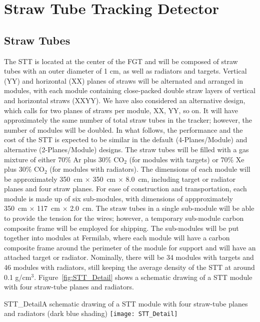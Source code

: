 \section{Straw Tube Tracking Detector}
\label{sec:nd-nnd-straw}

\subsection{Straw Tubes}

The STT is located at the center of the FGT and 
will be composed of straw tubes with an outer diameter of 1 cm, as well as 
radiators and targets. 
Vertical (YY) and horizontal (XX) planes of straws will be alternated and 
arranged in modules, with each module containing close-packed double straw layers 
of vertical and horizontal straws (XXYY). 
We have also considered an alternative design, which calls for two planes of straws
per module, XX, YY, so on. It will have approximately the same number of
total straw tubes in the tracker; however, the number of modules will be doubled.
In what follows, the performance and the cost of the STT is expected to be similar 
in the default (4-Planes/Module) and alternative (2-Planes/Module) designs.
The straw tubes will be filled with a
gas mixture of either 70\% Ar plus 30\% CO$_2$ (for modules with targets) or
70\% Xe plus 30\% CO$_2$ (for modules with radiators).
The dimensions of each module will
be approximately 350~cm $\times$ 350~cm $\times$ 8.0~cm, including 
target or radiator planes and four straw planes. For ease of construction and
transportation, each module is made up of six sub-modules, with dimensions of
appproximately 350~cm $\times$ 117~cm $\times$ 2.0~cm. 
The straw tubes in a single sub-module will be able to provide the tension 
for the wires; however, a temporary sub-module carbon composite frame will 
be employed for shipping. The sub-modules will be put together into modules 
at Fermilab, where each module will have a carbon composite frame around 
the perimeter of the module for support and will have an attached target or 
radiator. Nominally, there will be 34 modules with targets and 46 modules 
with radiators, still keeping the 
average density of the STT at around 0.1 g/cm$^3$. Figure~\ref{fig:STT_Detail}
shows a schematic drawing of a STT module with four straw-tube planes and
radiators.


\begin{cdrfigure}{STT_Detail}{A schematic drawing of a STT module with four straw-tube planes and
radiators (dark blue shading)}
\texttt{[image: STT\_Detail]}
\end{cdrfigure}

